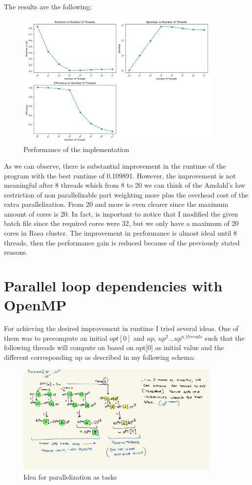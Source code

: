 \documentclass[unicode,11pt,a4paper,oneside,numbers=endperiod,openany]{scrartcl}
\begin{document}
The results are the following: 
\begin{figure}[H]
    \centering
    \includegraphics[width=0.9\textwidth]{./img/exe4/performance_analysis.png}
    \caption{Performance of the implementation}
\end{figure}

As we can observe, there is substantial improvement in the runtime of the program with the best runtime of 0.109891. 
However, the improvement is not meaningful after 8 threads which from 8 to 20 we can think of the Amdahl's law restriction
of non parallelizable part weighting more plus the overhead cost of the extra parallelization.
From 20 and more is even clearer since the maximum amount of cores is 20. In fact, is important to notice that I modified the 
given batch file since the required cores were 32, but we only have a maximum of 20 cores in Rosa cluster. 
The improvement in performance is almost ideal until 8 threads, then the performance gain is reduced because of the previously stated
reasons.

\section{Parallel loop dependencies with OpenMP }
For achieving the desired improvement in runtime I tried several ideas.
One of them was to precompute an initial $opt[0]$ and $up$, $up^2$...$up^{n\_threads}$  
such that the following threads will compute on based on opt[0] as initial value and the different corresponding 
up as described in my following schema:


\begin{figure}[H]
    \centering
    \includegraphics[width=0.9\textwidth]{./img/exe5/schema.jpeg}
    \caption{Idea for parallelization as tasks}
\end{figure}
\end{document}

